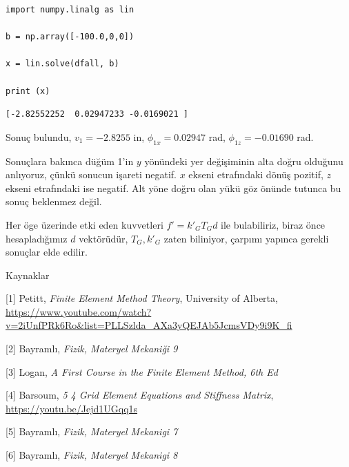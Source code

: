 \documentclass[12pt,fleqn]{article}\usepackage{../../common}
\begin{document}
\begin{verbatim}
import numpy.linalg as lin

b = np.array([-100.0,0,0])

x = lin.solve(dfall, b)

print (x)
\end{verbatim}

\begin{verbatim}
[-2.82552252  0.02947233 -0.0169021 ]
\end{verbatim}

Sonuç bulundu, $v_1 = -2.8255$ in, $\phi_{1x} = 0.02947$ rad, $\phi_{1z} =
-0.01690$ rad.

Sonuçlara bakınca düğüm 1'in $y$ yönündeki yer değişiminin alta doğru olduğunu
anlıyoruz, çünkü sonucun işareti negatif. $x$ ekseni etrafındaki dönüş pozitif,
$z$ ekseni etrafındaki ise negatif. Alt yöne doğru olan yükü göz önünde tutunca
bu sonuç beklenmez değil.

Her öge üzerinde etki eden kuvvetleri $f' = k'_G T_G d$ ile bulabiliriz, biraz
önce hesapladığımız $d$ vektörüdür, $T_G,k'_G$ zaten biliniyor, çarpımı yapınca
gerekli sonuçlar elde edilir.

Kaynaklar

[1] Petitt, {\em Finite Element Method Theory}, University of Alberta,
    \url{https://www.youtube.com/watch?v=2iUnfPRk6Ro&list=PLLSzlda_AXa3yQEJAb5JcmsVDy9i9K_fi}

[2] Bayramlı, {\em Fizik, Materyel Mekaniği 9}

[3] Logan, {\em A First Course in the Finite Element Method, 6th Ed}

[4] Barsoum, {\em 5 4 Grid Element Equations and Stiffness Matrix},
    \url{https://youtu.be/Jejd1UGqq1s}

[5] Bayramlı, {\em Fizik, Materyel Mekanigi 7}

[6] Bayramlı, {\em Fizik, Materyel Mekanigi 8}
\end{document}
